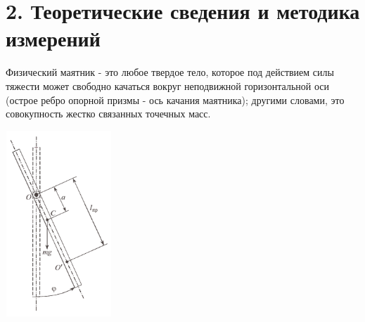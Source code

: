 \section* {2. Теоретические сведения и методика измерений}

    Физический маятник - это любое твердое тело, которое под действием силы тяжести может свободно качаться вокруг неподвижной горизонтальной оси (острое ребро опорной призмы - ось качания маятника); другими словами, это совокупность жестко связанных точечных масс.\\ 
    
\begin{center}
\includegraphics[width=4cm, height=7cm]{phys_mayat}
\end{center}

